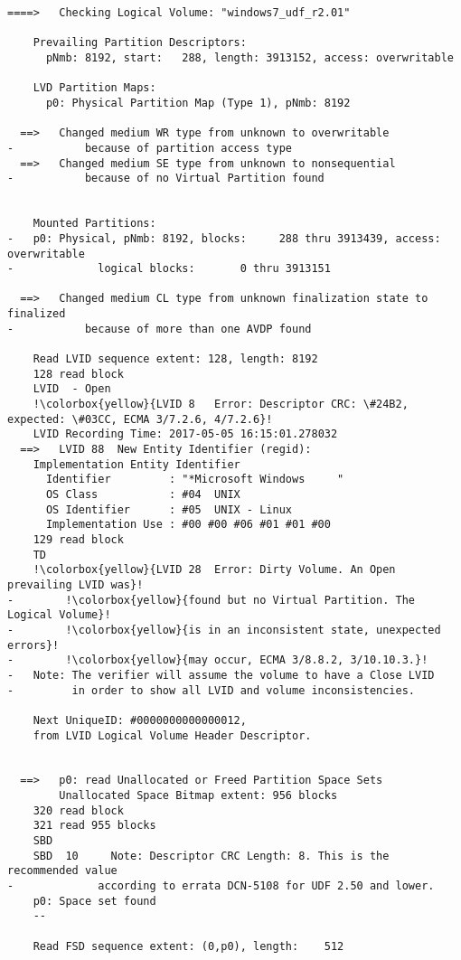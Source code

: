 \begin{lstlisting}
====>   Checking Logical Volume: "windows7_udf_r2.01"

    Prevailing Partition Descriptors:
      pNmb: 8192, start:   288, length: 3913152, access: overwritable

    LVD Partition Maps:
      p0: Physical Partition Map (Type 1), pNmb: 8192

  ==>   Changed medium WR type from unknown to overwritable
-           because of partition access type
  ==>   Changed medium SE type from unknown to nonsequential
-           because of no Virtual Partition found


    Mounted Partitions:
-   p0: Physical, pNmb: 8192, blocks:     288 thru 3913439, access: overwritable
-             logical blocks:       0 thru 3913151

  ==>   Changed medium CL type from unknown finalization state to finalized
-           because of more than one AVDP found

    Read LVID sequence extent: 128, length: 8192
    128 read block
    LVID  - Open
    !\colorbox{yellow}{LVID 8   Error: Descriptor CRC: \#24B2, expected: \#03CC, ECMA 3/7.2.6, 4/7.2.6}!
    LVID Recording Time: 2017-05-05 16:15:01.278032
  ==>   LVID 88  New Entity Identifier (regid):
    Implementation Entity Identifier
      Identifier         : "*Microsoft Windows     "
      OS Class           : #04  UNIX
      OS Identifier      : #05  UNIX - Linux
      Implementation Use : #00 #00 #06 #01 #01 #00
    129 read block
    TD  
    !\colorbox{yellow}{LVID 28  Error: Dirty Volume. An Open prevailing LVID was}!
-        !\colorbox{yellow}{found but no Virtual Partition. The Logical Volume}!
-        !\colorbox{yellow}{is in an inconsistent state, unexpected errors}!
-        !\colorbox{yellow}{may occur, ECMA 3/8.8.2, 3/10.10.3.}!
-   Note: The verifier will assume the volume to have a Close LVID
-         in order to show all LVID and volume inconsistencies.

    Next UniqueID: #0000000000000012,
    from LVID Logical Volume Header Descriptor.


  ==>   p0: read Unallocated or Freed Partition Space Sets
        Unallocated Space Bitmap extent: 956 blocks
    320 read block
    321 read 955 blocks
    SBD 
    SBD  10     Note: Descriptor CRC Length: 8. This is the recommended value
-             according to errata DCN-5108 for UDF 2.50 and lower.
    p0: Space set found
    --

    Read FSD sequence extent: (0,p0), length:    512


\end{lstlisting}
